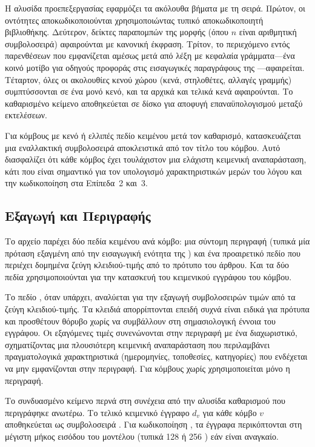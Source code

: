 Η αλυσίδα προεπεξεργασίας εφαρμόζει τα ακόλουθα βήματα με τη σειρά.
Πρώτον, οι
οντότητες  αποκωδικοποιούνται χρησιμοποιώντας τυπικό αποκωδικοποιητή
βιβλιοθήκης.
Δεύτερον, δείκτες παραπομπών της μορφής \texttt{\en{[n]}} (όπου $n$
είναι αριθμητική συμβολοσειρά) αφαιρούνται με κανονική έκφραση.
Τρίτον, το
περιεχόμενο εντός παρενθέσεων που εμφανίζεται αμέσως μετά από λέξη με κεφαλαία
γράμματα---ένα κοινό μοτίβο για οδηγούς προφοράς στις εισαγωγικές παραγράφους της
---αφαιρείται.
Τέταρτον, όλες οι ακολουθίες κενού χώρου (κενά, στηλοθέτες,
αλλαγές γραμμής) συμπτύσσονται σε ένα μονό κενό, και τα αρχικά και τελικά κενά
αφαιρούνται.
Το καθαρισμένο κείμενο αποθηκεύεται σε δίσκο για αποφυγή επαναϋπολογισμού
μεταξύ εκτελέσεων.

Για κόμβους με κενό ή ελλιπές πεδίο κειμένου μετά τον καθαρισμό, κατασκευάζεται μια
εναλλακτική συμβολοσειρά αποκλειστικά από τον τίτλο του κόμβου.
Αυτό διασφαλίζει
ότι κάθε κόμβος έχει τουλάχιστον μια ελάχιστη κειμενική αναπαράσταση, κάτι που
είναι σημαντικό για τον υπολογισμό χαρακτηριστικών μερών του λόγου και την κωδικοποίηση
 στα Επίπεδα~2 και~3.

\subsection{Εξαγωγή  και Περιγραφής}
\label{subsec:infobox-extraction}

Το αρχείο \texttt{} παρέχει δύο πεδία κειμένου ανά κόμβο: μια σύντομη
περιγραφή (τυπικά μία πρόταση εξαγμένη από την εισαγωγική ενότητα της )
και ένα προαιρετικό πεδίο  που περιέχει δομημένα ζεύγη κλειδιού-τιμής
από το πρότυπο  του άρθρου.
Και τα δύο πεδία χρησιμοποιούνται για την
κατασκευή του κειμενικού εγγράφου του κόμβου.

Το πεδίο , όταν υπάρχει, αναλύεται για την εξαγωγή συμβολοσειρών τιμών
από τα ζεύγη κλειδιού-τιμής.
Τα κλειδιά απορρίπτονται επειδή συχνά είναι ειδικά για
πρότυπα και προσθέτουν θόρυβο χωρίς να συμβάλλουν στη σημασιολογική έννοια του
εγγράφου.
Οι εξαγόμενες τιμές  συνενώνονται στην περιγραφή με ένα
διαχωριστικό, σχηματίζοντας μια πλουσιότερη κειμενική αναπαράσταση που περιλαμβάνει
πραγματολογικά χαρακτηριστικά (ημερομηνίες, τοποθεσίες, κατηγορίες) που ενδέχεται
να μην εμφανίζονται στην περιγραφή.
Για κόμβους χωρίς  χρησιμοποιείται
μόνο η περιγραφή.

Το συνδυασμένο κείμενο περνά στη συνέχεια από την αλυσίδα καθαρισμού που
περιγράφηκε ανωτέρω.
Το τελικό κειμενικό έγγραφο $d_v$ για κάθε κόμβο $v$
αποθηκεύεται ως συμβολοσειρά .
Για κωδικοποίηση , τα
έγγραφα περικόπτονται στη μέγιστη μήκος εισόδου του μοντέλου (τυπικά 128 ή 256
) εάν είναι αναγκαίο.


